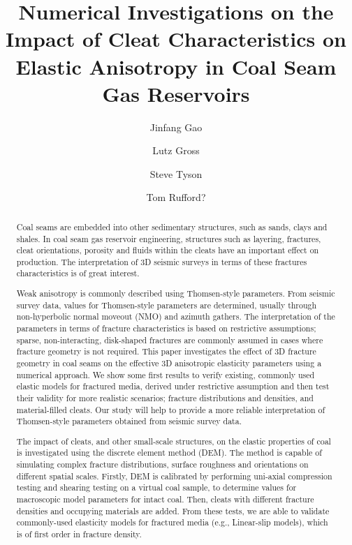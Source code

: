 \documentclass[review,authoryear]{elsarticle}
\begin{document}
\begin{frontmatter}

\title{Numerical Investigations on the Impact of Cleat Characteristics on Elastic Anisotropy in Coal Seam Gas Reservoirs}
\author[UQ]{Jinfang Gao}

\author[UQ]{Lutz Gross}

\author[UQ]{Steve Tyson}

\author[UQ]{Tom Rufford?}
\ead{}


\address[UQ]{Centre for Geoscience Computing, School of Earth Sciences,
The University of Queensland, St. Lucia, Brisbane, QLD \emph{4072}, Australia}


\begin{abstract}
Coal seams are embedded into other sedimentary structures, such as sands, clays and shales. In coal seam gas reservoir engineering, structures such as layering, fractures, cleat orientations, porosity and fluids within the cleats have an important effect on production. The interpretation of 3D seismic surveys in terms of these fractures characteristics is of great interest.

Weak anisotropy is commonly described using Thomsen-style parameters. From seismic survey data, values for Thomsen-style parameters are determined, 
usually through non-hyperbolic normal moveout (NMO) and azimuth gathers. The interpretation of the parameters in terms of fracture characteristics 
is based on restrictive assumptions; sparse, non-interacting, disk-shaped fractures are commonly assumed in cases where fracture geometry is not required. 
This paper investigates the effect of 3D fracture geometry in coal seams on the effective 3D anisotropic elasticity parameters using a numerical approach. 
We show some first results to verify existing, commonly used elastic models for fractured media, derived under restrictive assumption and then test their validity for more 
realistic scenarios; fracture distributions and densities, and material-filled cleats. Our study will help to provide a more reliable interpretation of Thomsen-style parameters obtained from seismic survey data. 

The impact of cleats, and other small-scale structures, on the elastic properties of coal is investigated using the discrete element method (DEM). The method is capable of simulating complex fracture distributions, surface roughness and orientations on different spatial scales. Firstly, DEM is calibrated by performing uni-axial compression testing and shearing testing on a virtual coal sample, to determine values for macroscopic model parameters for intact coal. Then, cleats with different fracture densities and occupying materials are added. From these tests, we are able to validate commonly-used elasticity models for fractured media (e.g., Linear-slip models), which is of first order in fracture density. 


\end{abstract}
\end{frontmatter}
\end{document}

